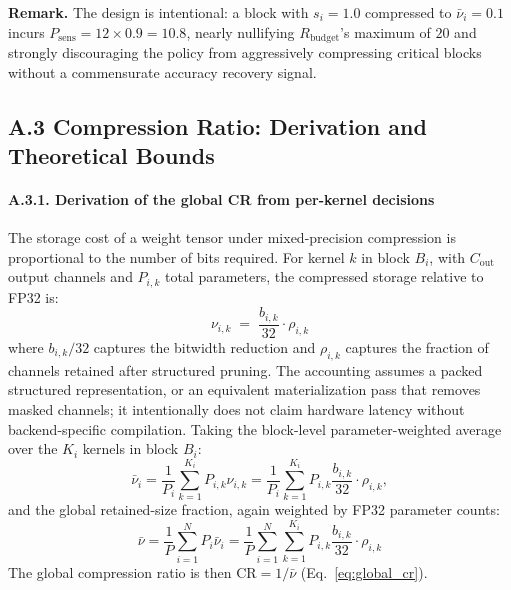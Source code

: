 \documentclass[preprint,12pt,authoryear]{elsarticle}
\begin{document}
\noindent\textbf{Remark.} The design is intentional: a block with $s_i = 1.0$
compressed to $\bar{\nu}_i = 0.1$ incurs $P_{\mathrm{sens}} = 12 \times 0.9 = 10.8$,
nearly nullifying $R_{\mathrm{budget}}$'s maximum of $20$ and strongly discouraging
the policy from aggressively compressing critical blocks without a commensurate accuracy
recovery signal.

\subsection*{A.3 \; Compression Ratio: Derivation and Theoretical Bounds}

\paragraph{A.3.1. Derivation of the global CR from per-kernel decisions}
The storage cost of a weight tensor under mixed-precision compression is proportional
to the number of bits required. For kernel $k$ in block $B_i$, with $C_{\mathrm{out}}$
output channels and $P_{i,k}$ total parameters, the compressed storage relative to
FP32 is:
\begin{equation}
    \nu_{i,k} \;=\; \frac{b_{i,k}}{32} \cdot \rho_{i,k}
    \label{eq:cr_derivation}
\end{equation}
where $b_{i,k}/32$ captures the bitwidth reduction and $\rho_{i,k}$ captures the
fraction of channels retained after structured pruning. The accounting assumes a packed
structured representation, or an equivalent materialization pass that removes masked
channels; it intentionally does not claim hardware latency without backend-specific
compilation. Taking the block-level parameter-weighted average over the $K_i$ kernels
in block $B_i$:
\begin{equation}
    \bar{\nu}_i = \frac{1}{P_i} \sum_{k=1}^{K_i} P_{i,k}\nu_{i,k}
    = \frac{1}{P_i} \sum_{k=1}^{K_i} P_{i,k}\frac{b_{i,k}}{32} \cdot \rho_{i,k},
\end{equation}
and the global retained-size fraction, again weighted by FP32 parameter counts:
\begin{equation}
    \bar{\nu} = \frac{1}{P} \sum_{i=1}^{N} P_i\bar{\nu}_i
    = \frac{1}{P} \sum_{i=1}^{N} \sum_{k=1}^{K_i} P_{i,k}
      \frac{b_{i,k}}{32} \cdot \rho_{i,k}
\end{equation}
The global compression ratio is then $\mathrm{CR} = 1/\bar{\nu}$
(Eq.~\eqref{eq:global_cr}).
\end{document}
